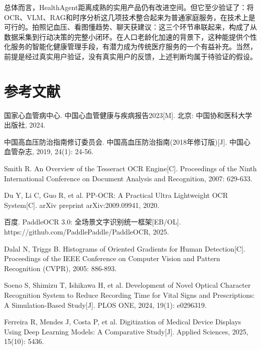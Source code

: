 \documentclass[zihao=-4,a4paper]{ctexart}
\numberwithin{figure}{section}
\numberwithin{table}{section}
\begin{document}
总体而言，HealthAgent距离成熟的实用产品仍有改进空间。但它至少验证了：将OCR、VLM、RAG和时序分析这几项技术整合起来为普通家庭服务，在技术上是可行的。拍照记血压、看图懂趋势、聊天获建议：这三个环节串联起来，构成了从数据采集到行动决策的完整小闭环。在人口老龄化加速的背景下，这种能提供个性化服务的智能化健康管理手段，有潜力成为传统医疗服务的一个有益补充。当然，前提是经过真实用户验证，没有真实用户的反馈，上述判断均属于待验证的假设。

\newpage
\section*{参考文献}

\begin{enumerate}[label={[\arabic*]}]

    \item 国家心血管病中心. 中国心血管健康与疾病报告2023[M]. 北京: 中国协和医科大学出版社, 2024.

    \item 中国高血压防治指南修订委员会. 中国高血压防治指南(2018年修订版)[J]. 中国心血管杂志, 2019, 24(1): 24-56.

    \item Smith R. An Overview of the Tesseract OCR Engine[C]. Proceedings of the Ninth International Conference on Document Analysis and Recognition, 2007: 629-633.

    \item Du Y, Li C, Guo R, et al. PP-OCR: A Practical Ultra Lightweight OCR System[C]. arXiv preprint arXiv:2009.09941, 2020.

    \item 百度. PaddleOCR 3.0: 全场景文字识别统一框架[EB/OL]. https://github.com/PaddlePaddle/PaddleOCR, 2025.

    \item Dalal N, Triggs B. Histograms of Oriented Gradients for Human Detection[C]. Proceedings of the IEEE Conference on Computer Vision and Pattern Recognition (CVPR), 2005: 886-893.

    \item Soeno S, Shimizu T, Ishikawa H, et al. Development of Novel Optical Character Recognition System to Reduce Recording Time for Vital Signs and Prescriptions: A Simulation-Based Study[J]. PLOS ONE, 2024, 19(1): e0296319.

    \item Ferreira R, Mendes J, Costa P, et al. Digitization of Medical Device Displays Using Deep Learning Models: A Comparative Study[J]. Applied Sciences, 2025, 15(10): 5436.


\end{enumerate}
\end{document}
